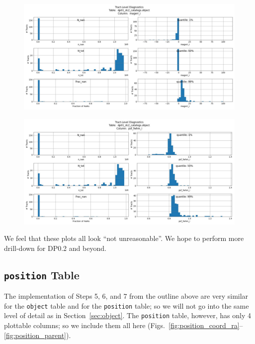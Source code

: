 \documentclass[DM,authoryear,toc]{lsstdoc}
\begin{document}
\begin{figure}[h]
\centering
\includegraphics[width=1.0\linewidth]{Plots/object_magerr_i.pdf}
\caption{}
\label{fig:object_magerr_i}
\end{figure}

\begin{figure}[h]
\centering
\includegraphics[width=1.0\linewidth]{Plots/object_psf_fwhm_i.pdf}
\caption{}
\label{fig:object_psf_fwhm_i}
\end{figure}

We feel that these plots all look ``not unreasonable''.  We hope to
perform more drill-down for DP0.2 and beyond.


\subsection{\texttt{position} Table} \label{sec:position}

The implementation of Steps 5, 6, and 7 from the outline above are
very similar for the \texttt{object} table and for the
\texttt{position} table; so we will not go into the same
level of detail as in Section~\ref{sec:object}.  The \texttt{position}
table, however, has only 4 plottable columns; so we include them all here
(Figs.~\ref{fig:position_coord_ra}--\ref{fig:position_parent}).
\end{document}
